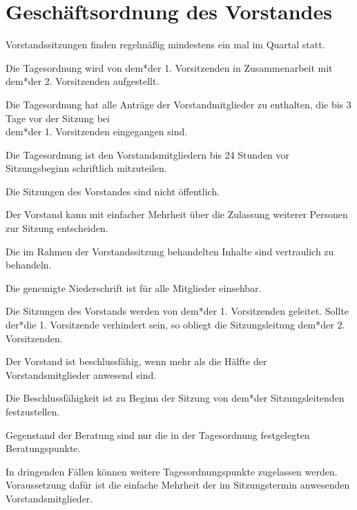 \section{Geschäftsordnung des Vorstandes}

\begin{gfvorstand}

  Vorstandssitzungen finden regelmä\ss{}ig mindestens ein mal im Quartal statt.

  Die Tagesordnung wird von dem*der 1. Vorsitzenden in Zusammenarbeit mit dem*der 2. Vorsitzenden aufgestellt.

  Die Tagesordnung hat alle Anträge der Vorstandmitglieder zu enthalten, die bis 3 Tage vor der Sitzung bei \\ dem*der 1. Vorsitzenden eingegangen sind.

  Die Tagesordnung ist den Vorstandsmitgliedern bis 24 Stunden vor Sitzungsbeginn schriftlich mitzuteilen.

  Die Sitzungen des Vorstandes sind nicht öffentlich.

  Der Vorstand kann mit einfacher Mehrheit über die Zulassung weiterer Personen zur Sitzung entscheiden.

  Die im Rahmen der Vorstandssitzung behandelten Inhalte sind vertraulich zu behandeln.

  Die genemigte Niederschrift ist für alle Mitglieder einsehbar.

  Die Sitzungen des Vorstands werden von dem*der 1. Vorsitzenden geleitet. Sollte der*die 1. Vorsitzende verhindert sein, so obliegt die Sitzungsleitung dem*der 2. Vorsitzenden.


  Der Vorstand ist beschlussfähig, wenn mehr als die Hälfte der Vorstandsmitglieder anwesend sind.

  Die Beschlussfähigkeit ist zu Beginn der Sitzung von dem*der Sitzungsleitenden festzustellen.


  Gegenstand der Beratung sind nur die in der Tagesordnung festgelegten Beratungspunkte.

  In dringenden Fällen können weitere Tagesordnungspunkte zugelassen werden. Voraussetzung dafür ist die einfache Mehrheit der im Sitzungstermin anwesenden Vorstandsmitglieder.


\end{gfvorstand}
